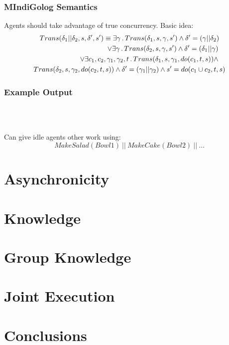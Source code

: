 \documentclass{beamer}
\begin{document}
\begin{frame}
\frametitle{MIndiGolog Semantics}
Agents should take advantage of true concurrency. Basic idea:
\begin{multline*}
Trans(\delta_{1}||\delta_{2},s,\delta',s')\equiv\exists\gamma\,.\, Trans(\delta_{1},s,\gamma,s')\wedge\delta'=(\gamma||\delta_{2})\\
\shoveright{\vee\exists\gamma\,.\, Trans(\delta_{2},s,\gamma,s')\wedge\delta'=(\delta_{1}||\gamma)}\\
\shoveright{\vee\exists c_{1},c_{2},\gamma_{1},\gamma_{2},t\,.\, Trans(\delta_{1},s,\gamma_{1},do(c_{1},t,s))\wedge}\\ 
Trans(\delta_{2},s,\gamma_{2},do(c_{2},t,s))\wedge\delta'=(\gamma_{1}||\gamma_{2})\wedge s'=do(c_{1}\cup c_{2},t,s)
\end{multline*}
\end{frame}

\begin{frame}
\frametitle{Example Output}
\begin{columns}
  \begin{column}{0.5\textwidth}
  \end{column}
  \begin{column}{0.5\textwidth}
  \end{column}
\end{columns}
\ \\
\ \\
\pause
Can give idle agents other work using:\[
MakeSalad(Bowl1)\ ||\ MakeCake(Bowl2)\ ||\ \dots\]
\end{frame}

\section{Asynchronicity}

\begin{frame}
\end{frame}

\section{Knowledge}

\begin{frame}
\end{frame}

\section{Group Knowledge}

\begin{frame}
\end{frame}

\section{Joint Execution}

\begin{frame}
\end{frame}

\section{Conclusions}

\begin{frame}
\end{frame}
\end{document}
